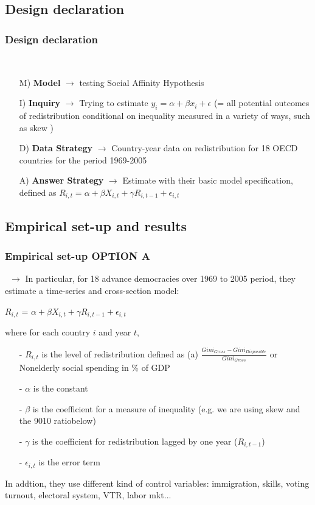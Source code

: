 \documentclass{beamer}
\begin{document}
\begin{frame}
\subsection{Design declaration} 
\frametitle{Design declaration}\
\begin{itemize}
\item[M)] \textbf{Model} $\longrightarrow$  testing Social Affinity Hypothesis\\
\item[I)] \textbf{Inquiry} $\longrightarrow$ Trying to estimate $y_i = \alpha + \beta x_i + \epsilon$ (= all potential outcomes of redistribution conditional on inequality measured in a variety of ways, such as skew
)
\item[D)] \textbf{Data Strategy} $\longrightarrow$ Country-year data on redistribution for 18 OECD countries for the period 1969-2005 
\item[A)]\textbf{Answer Strategy} $\longrightarrow$  Estimate with their basic model specification, defined as $R_{i,t} = \alpha + \beta X_{i,t} + \gamma R_{i, t-1} + \epsilon_{i,t}$
\end{itemize}
\end{frame}

\begin{frame}
\subsection{Empirical set-up and results}
\frametitle{Empirical set-up OPTION A}\
$\longrightarrow$ In particular, for 18 advance democracies over 1969 to 2005 period, they estimate a time-series and cross-section model:\\
\begin{center}
$R_{i,t} $ = $\alpha + \beta X_{i,t} + \gamma R_{i, t-1} + \epsilon_{i,t}$
\end{center}
where for each country $i$ and year $t$, 
\begin{scriptsize}
\begin{itemize}
\item[-] $R_{i,t}$ is the level of redistribution defined as (a) $\frac{Gini_{Gross} - Gini_{Disposable}}{Gini_{Gross}}$ or Nonelderly social spending in \% of GDP
\item[-]$\alpha$ is the constant
\item[-] $\beta$ is the coefficient for a measure of inequality (e.g. we are using skew and the 9010 ratiobelow)
\item[-]  $\gamma$ is the coefficient for redistribution lagged by one year ($R_{i,t-1}$)
\item[-] $\epsilon_{i,t}$ is the error term
\end{itemize}
\end{scriptsize}
In addtion, they use different kind of control variables: immigration, skills, voting turnout, electoral system, VTR, labor mkt...
\end{frame}
\end{document}
